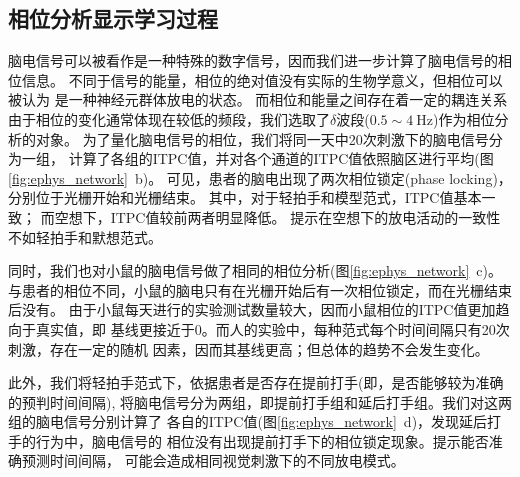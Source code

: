 \subsection{相位分析显示学习过程}
脑电信号可以被看作是一种特殊的数字信号，因而我们进一步计算了脑电信号的相位信息。
不同于信号的能量，相位的绝对值没有实际的生物学意义，但相位可以被认为
是一种神经元群体放电的状态\cite{gu2010phase}。
而相位和能量之间存在着一定的耦连关系\cite{watrous2015phase,demiralp2007gamma}
由于相位的变化通常体现在较低的频段，我们选取了\(\delta\)波段(\(0.5 \sim 4\ \text{Hz}\))作为相位分析的对象。
为了量化脑电信号的相位，我们将同一天中20次刺激下的脑电信号分为一组，
计算了各组的ITPC值，并对各个通道的ITPC值依照脑区进行平均(图\ref{fig:ephys_network}~b)。
可见，患者的脑电出现了两次相位锁定(phase locking)，分别位于光栅开始和光栅结束。
其中，对于轻拍手和模型范式，ITPC值基本一致；
而空想下，ITPC值较前两者明显降低。%
提示在空想下的放电活动的一致性不如轻拍手和默想范式。

同时，我们也对小鼠的脑电信号做了相同的相位分析(图\ref{fig:ephys_network}~c)。
与患者的相位不同，小鼠的脑电只有在光栅开始后有一次相位锁定，而在光栅结束后没有。
由于小鼠每天进行的实验测试数量较大，因而小鼠相位的ITPC值更加趋向于真实值，即
基线更接近于0。而人的实验中，每种范式每个时间间隔只有20次刺激，存在一定的随机
因素，因而其基线更高；但总体的趋势不会发生变化。

此外，我们将轻拍手范式下，依据患者是否存在提前打手(即，是否能够较为准确的预判时间间隔),
将脑电信号分为两组，即提前打手组和延后打手组。我们对这两组的脑电信号分别计算了
各自的ITPC值(图\ref{fig:ephys_network}~d)，发现延后打手的行为中，脑电信号的
相位没有出现提前打手下的相位锁定现象。提示能否准确预测时间间隔，
可能会造成相同视觉刺激下的不同放电模式。

